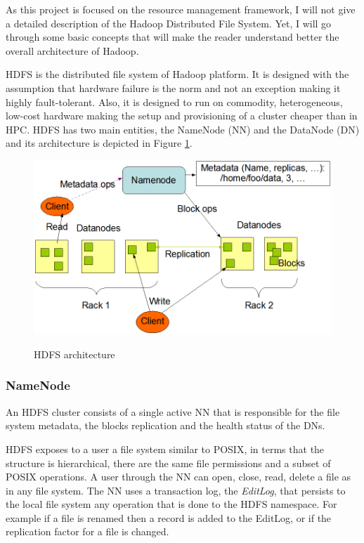 As this project is focused on the resource management framework, I will
not give a detailed description of the Hadoop Distributed File
System. Yet, I will go through some basic concepts that will make the
reader understand better the overall architecture of Hadoop.

HDFS is the distributed file system of Hadoop platform. It is designed
with the assumption that hardware failure is the norm and not an
exception making it highly fault-tolerant. Also, it is designed to run
on commodity, heterogeneous, low-cost hardware making the setup and provisioning of
a cluster cheaper than in HPC. HDFS has two main entities, the NameNode
(NN) and the DataNode (DN) and its architecture is depicted in Figure
\ref{fig:hadoop_hdfs}.

\begin{figure}
\centering
\includegraphics[scale=0.7]{resources/images/Background/hdfs_arch.png}
\label{fig:hadoop_hdfs}
\caption{HDFS architecture}
\end{figure}

\subsubsection{NameNode}
\label{sssec:nn}

An HDFS cluster consists of a single active NN that is responsible for the
file system metadata, the blocks replication and the health
status of the DNs.

HDFS exposes to a user a file system similar to POSIX, in terms that
the structure is hierarchical, there are the same file permissions 
and a subset of POSIX operations. A user through the NN can open,
close, read, delete a file as in any file system. The NN uses a transaction
log, the \emph{EditLog}, that persists to the local file system any
operation that is done to the HDFS namespace. For example if a file is
renamed then a record is added to the EditLog, or if the replication
factor for a file is changed.


